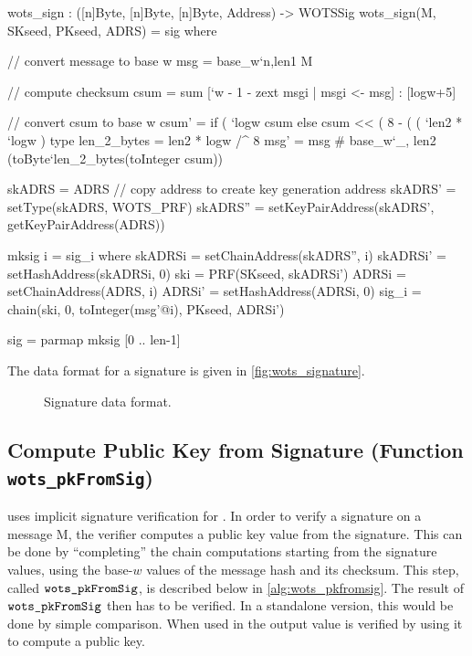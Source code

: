 \begin{code}
  wots_sign : ([n]Byte, [n]Byte, [n]Byte, Address) -> WOTSSig
  wots_sign(M, SKseed, PKseed, ADRS) = sig where

    // convert message to base w
    msg = base_w`{n,len1} M

    // compute checksum
    csum = sum [`w - 1 - zext msgi | msgi <- msg] : [logw+5]

    // convert csum to base w
    csum' =
      if ( `logw%
        csum
      else
        csum << ( 8 - ( ( `len2 * `logw ) %
    type len_2_bytes = len2 * logw /^ 8
    msg' = msg # base_w`{_, len2} (toByte`{len_2_bytes}(toInteger csum))

    skADRS = ADRS // copy address to create key generation address
    skADRS' = setType(skADRS, WOTS_PRF)
    skADRS'' = setKeyPairAddress(skADRS', getKeyPairAddress(ADRS))

    mksig i = sig_i where
      skADRSi = setChainAddress(skADRS'', i)
      skADRSi' = setHashAddress(skADRSi, 0)
      ski = PRF(SKseed, skADRSi')
      ADRSi = setChainAddress(ADRS, i)
      ADRSi' = setHashAddress(ADRSi, 0)
      sig_i = chain(ski, 0, toInteger(msg'@i), PKseed, ADRSi')

    sig = parmap mksig [0 .. len-1]
\end{code}

The data format for a signature is given in \autoref{fig:wots_signature}.

\begin{figure}[h!]
  \centering
  \caption{\wotsp Signature data format.}
  \label{fig:wots_signature}
\end{figure}

\subsection{\wotsp Compute Public Key from Signature (Function \texttt{wots\_pkFromSig})}
\spx uses implicit signature verification for \wotsp. In order to verify a
\wotsp signature \wotssig on a message M, the verifier
computes a \wotsp public key value from the signature. This can be
done by ``completing'' the chain computations starting from the
signature values, using the base-$w$ values of the message hash and its
checksum. This step, called $\texttt{wots\_pkFromSig}$, is described below in
\autoref{alg:wots_pkfromsig}. The result of $\texttt{wots\_pkFromSig}$
then has to be verified. In a standalone version, this would be done by simple
comparison. When used in \spx the output value is verified by using it to
compute a \spx public key.

